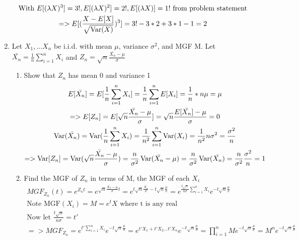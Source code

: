 \documentclass[11pt]{article}
\newcommand{\Var}{\mathop{\rm Var}}
\begin{document}
\begin{enumerate}
\begin{gather}
	\text{With }E[(\lambda X)^3] = 3!, E[(\lambda X)^2] = 2!, E[(\lambda X)]=1! \text{ from problem statement}\\
	=> E[(\frac{X-E[X]}{\sqrt{\Var(X)}})^3] = 3! - 3*2 + 3*1 - 1 = 2
\end{gather}
\item Let $X_1,...X_n$ be i.i.d. with mean $\mu$, variance $\sigma^2$, and MGF M. Let \\
 $\bar{X_n}=\frac{1}{n}\sum_{i=1}^{n} X_i$ 
 and
 $Z_n = \sqrt{n}\frac{\bar{X_n}-\mu}{\sigma}$
\begin{enumerate}
	\item Show that $Z_n$ has mean 0 and variance 1
	\begin{gather}
		E[\bar{X_n}]=E[\frac{1}{n}\sum_{i=1}^{n} X_i] = \frac{1}{n}\sum_{i=1}^{n} E[X_i] =  \frac{1}{n} * n\mu =\mu\\
		=> E[Z_n] = E[\sqrt{n}\frac{\bar{X_n}-\mu}{\sigma}] = \sqrt{n}\frac{E[\bar{X_n}]-\mu}{\sigma} = 0\\
		\Var(\bar{X_n}) = \Var(\frac{1}{n}\sum_{i=1}^{n} X_i) = \frac{1}{n^2}\sum_{i=1}^{n} \Var(X_i) = \frac{1}{n^2} n\sigma^2=\frac{\sigma^2}{n}\\
		=> \Var[Z_n]=\Var(\sqrt{n}\frac{\bar{X_n}-\mu}{\sigma}) = \frac{n}{\sigma^2}\Var(\bar{X_n}-\mu) = \frac{n}{\sigma^2}\Var(\bar{X_n})= \frac{n}{\sigma^2}\frac{\sigma^2}{n}=1
	\end{gather}
	\item Find the MGF of $Z_n$ in terms of M, the MGF of each $X_i$
	\begin{gather}
		MGF_{Z_n}(t)=e^{Z_nt} = e^{\sqrt{n}\frac{\bar{X_n}-\mu}{\sigma}t} =  e^{t\sqrt{n}\frac{\bar{X_n}}{\sigma} -t\sqrt{n}\frac{\mu}{\sigma}} = e^{\frac{t\sqrt{n}}{n\sigma}\sum_{i=1}^{n} X_i}e^{-t\sqrt{n}\frac{\mu}{\sigma}}\\
		\text{Note MGF}(X_i) = M = e^tX \text{ where t is any real}\\
		\text{Now let }\frac{t\sqrt{n}}{n\sigma} = t' \\
		=> MGF_{Z_n} = e^{t'\sum_{i=1}^{n} X_i}e^{-t\sqrt{n}\frac{\mu}{\sigma}} =  e^{t'X_1+t'X_2...t'X_n}e^{-t\sqrt{n}\frac{\mu}{\sigma}}= \prod_{i=1}^{n}Me^{-t\sqrt{n}\frac{\mu}{\sigma}} = M^ne^{-t\sqrt{n}\frac{\mu}{\sigma}}
	\end{gather}
\end{enumerate}
\end{enumerate}
\end{document}
